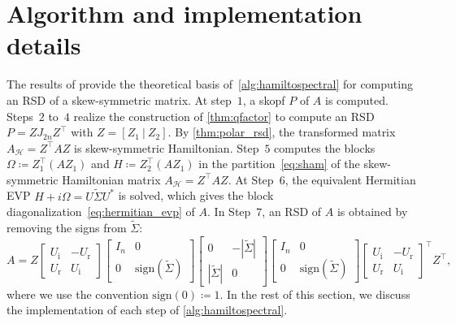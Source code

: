 \documentclass[final,onefignum,onetabnum,dvipsnames]{siamart251216}
\numberwithin{algorithm}{section}
\numberwithin{equation}{section}
\begin{document}
\section{Algorithm and implementation details} \label{sec:algorithm}

The results of  provide the theoretical basis of~\cref{alg:hamiltospectral} for computing an RSD of a skew-symmetric matrix. At step~$1$, a skopf $P$ of $A$ is computed. Steps~$2$ to~$4$
realize the construction of \cref{thm:qfactor} to compute an RSD $P = ZJ_{2n}Z^\top$ with $Z = [Z_1\ |\ Z_2]$.
By \cref{thm:polar_rsd}, the transformed matrix
$A_{\mathcal H}=Z^\top AZ$ is skew-symmetric Hamiltonian.
Step~$5$ computes the blocks 
$\Omega \coloneq Z_1^\top (AZ_1)$ and $H \coloneq Z_2^\top (AZ_1)$ in the partition~\cref{eq:sham}
of the skew-symmetric Hamiltonian matrix $A_\mathcal{H} = Z^\top AZ$. At Step~$6$, the equivalent Hermitian EVP  $H+i\Omega = U\widetilde{\Sigma} U^*$ is solved, which gives the block diagonalization~\eqref{eq:hermitian_evp} of $A$. 
In Step~$7$, an RSD of $A$ is obtained by removing the signs from $\widetilde{\Sigma}$:
\begin{equation*}
    A = Z  \begin{bmatrix}
            U_\mathrm{i}&-U_\mathrm{r}\\
            U_\mathrm{r}&U_\mathrm{i}
        \end{bmatrix} \begin{bmatrix}
            I_n&0\\
            0&\mathrm{sign}(\widetilde{\Sigma} )
        \end{bmatrix}\begin{bmatrix}
            0&-|\widetilde{\Sigma} |\\
            |\widetilde{\Sigma} | & 0
        \end{bmatrix}\begin{bmatrix}
            I_n&0\\
            0&\mathrm{sign}(\widetilde{\Sigma} )
        \end{bmatrix} \begin{bmatrix}
            U_\mathrm{i}&-U_\mathrm{r}\\
            U_\mathrm{r}&U_\mathrm{i}
        \end{bmatrix}^\top Z^\top,
\end{equation*}
where we use the convention $\mathrm{sign}(0)\coloneq 1$. 
In the rest of this section, we discuss the implementation of each step of \cref{alg:hamiltospectral}.
\end{document}
